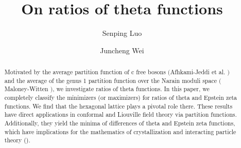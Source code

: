 \documentclass[reqno,english]{amsart}
\newtheorem{open problem}{Open Problem}[section]
\newtheorem{open question}{Open Question}[section]
\newtheorem{open questions on hexagonal lattice}{Open Questions on hexagonal lattice}[section]
\begin{document}


\title[Ratio of theta functions]{\bf On ratios of theta functions}

\author{Senping Luo}



\author{Juncheng Wei}




\address[S.~Luo]{School of Mathematics and statistics, Jiangxi Normal University, Nanchang, 330022, China.}
\address[J.~Wei]{Department of Mathematics, Chinese University of Hong
Kong, Shatin, NT, Hong Kong.}














\begin{abstract} Motivated by the average partition function of c free bosons $($Afhkami-Jeddi et al. \cite{Afhk2021}$)$ and the average of the genus 1 partition function over the Narain moduli space $($Maloney-Witten \cite{Witten2020}$)$, we investigate ratios of theta functions.
In this paper, we completely classify the minimizers (or maximizers) for
ratios of theta and Epstein zeta functions. We find that the hexagonal lattice plays a pivotal role there.
These results have direct applications in conformal and Liouville field theory via partition functions. Additionally, they yield the minima of differences of theta and Epstein zeta functions, which have implications for the mathematics of crystallization and interacting particle theory (\cite{Bet2016,Bet2019AMP}).


\end{abstract}



\maketitle



\setcounter{equation}{0}
\end{document}
